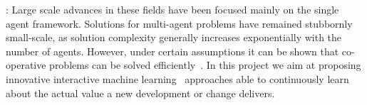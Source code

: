 \documentclass[12pt]{article}
\begin{document}
:  Large scale advances in these fields have been focused mainly
on the single agent framework. Solutions for multi-agent problems have
remained stubbornly small-scale, as solution complexity generally
increases exponentially with the number of agents. However, under
certain assumptions it can be shown that co-operative problems can be
solved efficiently~\cite{brammert:duct:jair:2014}. 
In this project we aim at proposing innovative interactive machine learning~\cite{interactiveMachineLearning} approaches able to %
continuously learn about the actual value a new development or change delivers. %
\end{document}
